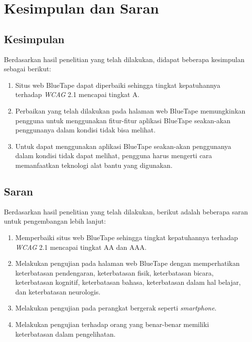 \chapter{Kesimpulan dan Saran}
\label{chap:kesimpulan_dan_saran}

\section{Kesimpulan}
\label{sec:kesimpulan}
Berdasarkan hasil penelitian yang telah dilakukan, didapat beberapa kesimpulan sebagai berikut:

\begin{enumerate}
    \item Situs web BlueTape dapat diperbaiki sehingga tingkat kepatuhannya terhadap \textit{WCAG} 2.1 mencapai tingkat A.
    \item Perbaikan yang telah dilakukan pada halaman web BlueTape memungkinkan pengguna untuk menggunakan fitur-fitur aplikasi BlueTape seakan-akan penggunanya dalam kondisi tidak bisa melihat.
    \item Untuk dapat menggunakan aplikasi BlueTape seakan-akan penggunanya dalam kondisi tidak dapat melihat, pengguna harus mengerti cara memanfaatkan teknologi alat bantu yang digunakan.
\end{enumerate}

\section{Saran}
\label{sec:saran}
Berdasarkan hasil penelitian yang telah dilakukan, berikut adalah beberapa saran untuk pengembangan lebih lanjut:
\begin{enumerate}
    \item Memperbaiki situs web BlueTape sehingga tingkat kepatuhannya terhadap \textit{WCAG} 2.1 mencapai tingkat AA dan AAA.
    \item Melakukan pengujian pada halaman web BlueTape dengan memperhatikan keterbatasan pendengaran, keterbatasan fisik, keterbatasan bicara, keterbatasan kognitif, keterbatasan bahasa, keterbatasan dalam hal belajar, dan keterbatasan neurologis.
    \item Melakukan pengujian pada perangkat bergerak seperti \textit{smartphone}.
    \item Melakukan pengujian terhadap orang yang benar-benar memiliki keterbatasan dalam pengelihatan.
\end{enumerate}